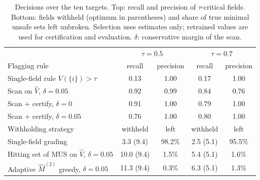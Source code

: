 \begin{table}[!tbp]
\centering\small
\caption{Decisions over the ten targets. Top: recall and precision of $\tau$-critical fields. Bottom: fields withheld (optimum
in parentheses) and share of true minimal unsafe sets left unbroken. Selection uses estimates only; retrained values are used
for certification and evaluation. $\delta$: conservative margin of the scan.}\label{tab:decision}
\begin{tabular}{lcccc}
\toprule
 & \multicolumn{2}{c}{$\tau=0.5$} & \multicolumn{2}{c}{$\tau=0.7$}\\
Flagging rule & recall & precision & recall & precision\\
\midrule
Single-field rule $V(\{i\})>\tau$ & 0.13 & 1.00 & 0.17 & 1.00 \\
Scan on $\hat V$, $\delta=0.05$ & 0.92 & 0.99 & 0.84 & 0.76 \\
Scan + certify, $\delta=0$ & 0.91 & 1.00 & 0.79 & 1.00 \\
Scan + certify, $\delta=0.05$ & 0.76 & 1.00 & 0.80 & 1.00 \\
\midrule
Withholding strategy & withheld & left & withheld & left\\
\midrule
Single-field grading & 3.3 (9.4) & 98.2\% & 2.5 (5.1) & 95.5\% \\
Hitting set of MUS on $\hat V$, $\delta=0.05$ & 10.0 (9.4) & 1.5\% & 5.4 (5.1) & 1.6\% \\
Adaptive $\hat M^{(2)}$ greedy, $\delta=0.05$ & 11.3 (9.4) & 0.3\% & 6.3 (5.1) & 1.3\% \\
\bottomrule
\end{tabular}
\end{table}
